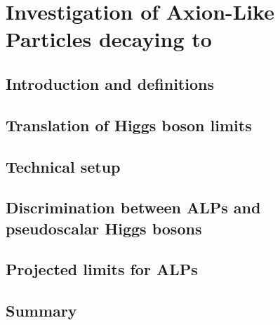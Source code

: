 \chapter{Investigation of Axion-Like Particles decaying to \ttbar}
\label{ch:alps}

\section{Introduction and definitions}

\section{Translation of Higgs boson limits}

\section{Technical setup}

\section{Discrimination between ALPs and pseudoscalar Higgs bosons}

\section{Projected limits for ALPs}

\section{Summary}